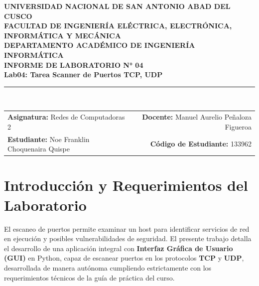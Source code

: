 \documentclass[10pt,a4paper]{article}
\newcommand{\TCP}{\textbf{TCP}}
\newcommand{\UDP}{\textbf{UDP}}
\begin{document}
\begin{tcolorbox}[colback=lightgray,colframe=unsaacblue,arc=3mm,boxrule=1.2pt]
\begin{center}
    {\large\textbf{\color{unsaacblue}UNIVERSIDAD NACIONAL DE SAN ANTONIO ABAD DEL CUSCO}}\\[1mm]
    {\normalsize\textbf{FACULTAD DE INGENIERÍA ELÉCTRICA, ELECTRÓNICA, INFORMÁTICA Y MECÁNICA}}\\[0.5mm]
    {\small\textbf{DEPARTAMENTO ACADÉMICO DE INGENIERÍA INFORMÁTICA}}\\[2mm]
    {\Large\textbf{\color{unsaacblue}INFORME DE LABORATORIO N° 04}}\\[1.5mm]
    {\large\textbf{Lab04: Tarea Scanner de Puertos TCP, UDP}}\\[2mm]
    \rule{0.9\textwidth}{0.6pt}\\[2mm]
    \begin{tabularx}{0.95\textwidth}{Xr}
        \textbf{Asignatura:} Redes de Computadoras 2 & \textbf{Docente:} Manuel Aurelio Peñaloza Figueroa \\
        \textbf{Estudiante:} Noe Franklin Choquenaira Quispe & \textbf{Código de Estudiante:} 133962 \\
        
    \end{tabularx}
\end{center}
\end{tcolorbox}

\vspace{1mm}

\section{Introducción y Requerimientos del Laboratorio}

El escaneo de puertos permite examinar un host para identificar servicios de red en ejecución y posibles vulnerabilidades de seguridad. El presente trabajo detalla el desarrollo de una aplicación integral con \textbf{Interfaz Gráfica de Usuario (GUI)} en Python, capaz de escanear puertos en los protocolos \TCP{} y \UDP{}, desarrollada de manera autónoma cumpliendo estrictamente con los requerimientos técnicos de la guía de práctica del curso.
\end{document}
